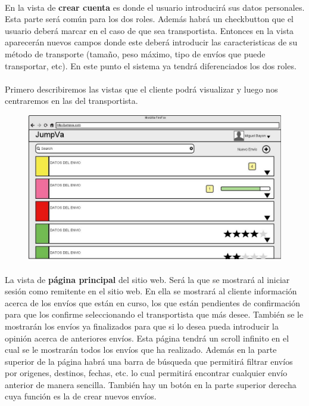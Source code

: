 \documentclass[10pt, a4paper,spanish]{article}
\begin{document}
			\paragraph{}
			En la vista de \textbf{crear cuenta} es donde el usuario introducirá sus datos personales. Esta parte será común para los dos roles. Además habrá un checkbutton que el usuario deberá marcar en el caso de que sea transportista. Entonces en la vista aparecerán nuevos campos donde este deberá introducir las caracteristicas de su método de transporte (tamaño, peso máximo, tipo de envíos que puede transportar, etc). En este punto el sistema ya tendrá diferenciados los dos roles.

			\paragraph{}
			Primero describiremos las vistas que el cliente podrá visualizar y luego nos centraremos en las del transportista.

			\begin{figure}[H]
				\centering
				\begin{minipage}[b]{0.8\textwidth}
					\includegraphics[width=\textwidth]{res/PaginaPrincipal.png}
				\end{minipage}
			\end{figure}

			\paragraph{}
			La vista de \textbf{página principal} del sitio web. Será la que se mostrará al iniciar sesión como remitente en el sitio web. En ella se mostrará al cliente información acerca de los envíos que están en curso, los que están pendientes de confirmación para que los confirme seleccionando el transportista que más desee. También se le mostrarán los envíos ya finalizados para que si lo desea pueda introducir la opinión acerca de anteriores envíos. Esta página tendrá un scroll infinito en el cual se le mostrarán todos los envíos que ha realizado. Además en la parte superior de la página habrá una barra de búsqueda que permitirá filtrar envíos por origenes, destinos, fechas, etc. lo cual permitirá encontrar cualquier envío anterior de manera sencilla. También hay un botón en la parte superior derecha cuya función es la de crear nuevos envíos.
\end{document}

